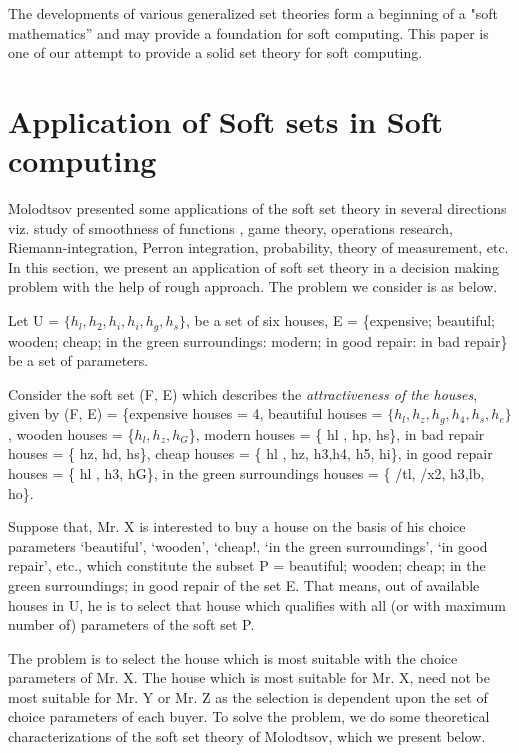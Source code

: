 \documentclass[12pt]{article} %
\begin{document}
The developments of various generalized set theories form a
beginning of a "soft mathematics” and may provide a
foundation for soft computing. This paper is one of our
attempt to provide a solid set theory for soft computing.
\section{Application of Soft sets in Soft computing}

Molodtsov presented some applications of the soft set theory in several directions viz.
study of smoothness of functions , game theory, operations research, Riemann-integration, Perron integration, probability, theory of measurement, etc. In this section, we present an application of soft set theory in a decision making problem with the help of rough approach. The problem we consider is as below. 


Let U = $\{ h_l , h_2, h_i, h_i, h_g, h_s\}$, be a set of six houses, E = \{expensive; beautiful; wooden;
cheap; in the green surroundings: modern; in good repair: in bad repair\} be a set of parameters.


Consider the soft set (F, E) which describes the \emph{attractiveness of the houses}, given by (F, E) =
\{expensive houses = 4, beautiful houses = $\{h_l, h_z, h_g, h_4, h_s, h_e\}$, wooden houses = \{$h_l, h_z, h_G$\},
modern houses = \{ hl , hp, hs\}, in bad repair houses = \{ hz, hd, hs\}, cheap houses = \{ hl , hz, h3,h4, h5, hi\}, in good repair houses = \{ hl , h3, hG\}, in the green surroundings houses = \{ /tl, /x2, h3,lb, ho\}.


Suppose that, Mr. X is interested to buy a house on the basis of his choice parameters ‘beautiful’,
‘wooden’, ‘cheap!, ‘in the green surroundings’, ‘in good repair’, etc., which constitute the
subset P = {beautiful; wooden; cheap; in the green surroundings; in good repair} of the set E.
That means, out of available houses in U, he is to select that house which qualifies with all (or
with maximum number of) parameters of the soft set P.

The problem is to select the house which is most suitable with the choice parameters of Mr. X. The house which is most suitable for Mr. X, need not be most suitable for Mr. Y or Mr. Z as the selection is dependent upon the set of choice parameters of each buyer.
To solve the problem, we do some theoretical characterizations of the soft set theory of
Molodtsov, which we present below.
\end{document}
